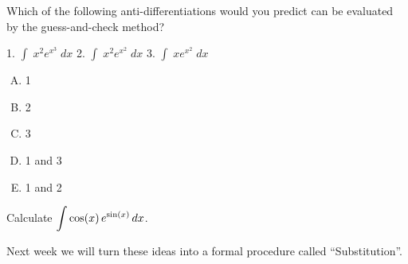 \newpage
\begin{problem}
  Which of the following anti-differentiations would you predict can
  be evaluated by the guess-and-check method? \\[2ex]
\begin{center}
1. $\displaystyle \int\;  x^2 e^{x^3}   \;dx$\hfill
2. $\displaystyle \int\; x^2 e^{x^2}   \;dx$\hfill
3. $\displaystyle \int\;  x e^{x^2}   \;dx$  \\[2ex]
\end{center}
\begin{enumerate}[A.]
\item 1 \\[1ex]
\item 2 \\[1ex]
\item 3 \\[1ex]
\item 1 and 3 \\[1ex]
\item 1 and 2
\end{enumerate}
\end{problem}

\newpage
\begin{problem}
	Calculate $\displaystyle \int\cos (x)\,e^{\sin (x)}\,dx$.
	
\end{problem}
\vfill

Next week we will turn these ideas into a formal procedure called ``Substitution''.




